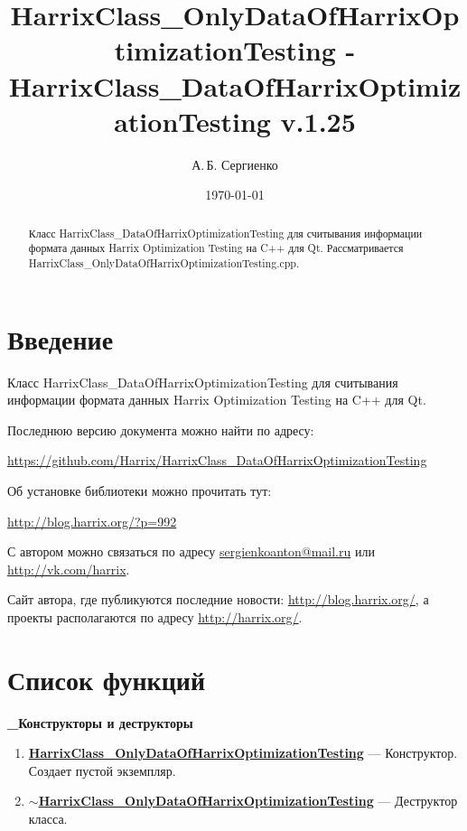 \documentclass[a4paper,12pt]{article}
\title{Har\-rix\-Class\_On\-ly\-Da\-ta\-Of\-Har\-rix\-Op\-ti\-mi\-za\-tion\-Test\-ing - Har\-rix\-Class\_Da\-ta\-Of\-Har\-rix\-Op\-ti\-mi\-za\-ti\-on\-Tes\-ting v.1.25}
\author{А.\,Б. Сергиенко}
\date{\today}
\begin{document}


\maketitle

\begin{abstract}
Класс HarrixClass\_DataOfHarrixOptimizationTesting для считывания информации формата данных Harrix Optimization Testing на C++ для Qt. Рассматривается HarrixClass\_OnlyDataOfHarrixOptimizationTesting.cpp.
\end{abstract}

\tableofcontents

\newpage

\section{Введение}

Класс HarrixClass\_DataOfHarrixOptimizationTesting для считывания информации формата данных Harrix Optimization Testing на C++ для Qt.

Последнюю версию документа можно найти по адресу:

\href{https://github.com/Harrix/HarrixClass\_DataOfHarrixOptimizationTesting}{https://github.com/Harrix/HarrixClass\_DataOfHarrixOptimizationTesting}

Об установке библиотеки можно прочитать тут:

\href{http://blog.harrix.org/?p=992}{http://blog.harrix.org/?p=992}

С автором можно связаться по адресу \href{mailto:sergienkoanton@mail.ru}{sergienkoanton@mail.ru} или  \href{http://vk.com/harrix}{http://vk.com/harrix}.

Сайт автора, где публикуются последние новости: \href{http://blog.harrix.org/}{http://blog.harrix.org/}, а проекты располагаются по адресу \href{http://harrix.org/}{http://harrix.org/}.

\newpage
\section{Список функций}\label{section_listfunctions}
\textbf{\_Конструкторы и деструкторы}
\begin{enumerate}

\item \textbf{\hyperref[HarrixClass_OnlyDataOfHarrixOptimizationTesting]{HarrixClass\_OnlyDataOfHarrixOptimizationTesting}} --- Конструктор. Создает пустой экземпляр.

\item \textbf{\hyperref[tildaHarrixClass_OnlyDataOfHarrixOptimizationTesting]{$\sim$HarrixClass\_OnlyDataOfHarrixOptimizationTesting}} --- Деструктор класса.

\end{enumerate}
\end{document}
